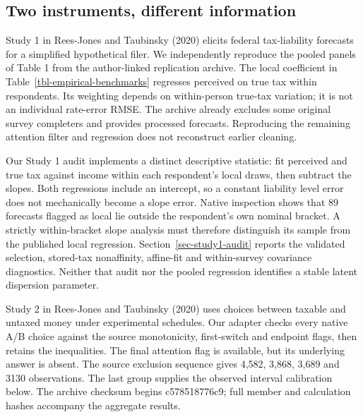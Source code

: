 \documentclass[
  11pt,
  letterpaper,
  DIV=11,
  numbers=noendperiod]{scrartcl}
\begin{document}
\subsection{Two instruments, different
information}\label{two-instruments-different-information}

Study 1 in Rees-Jones and Taubinsky (2020) elicits federal tax-liability
forecasts for a simplified hypothetical filer. We independently
reproduce the pooled panels of Table 1 from the author-linked
replication archive. The local coefficient in
Table~\ref{tbl-empirical-benchmarks} regresses perceived on true tax
within respondents. Its weighting depends on within-person true-tax
variation; it is not an individual rate-error RMSE. The archive already
excludes some original survey completers and provides processed
forecasts. Reproducing the remaining attention filter and regression
does not reconstruct earlier cleaning.

Our Study 1 audit implements a distinct descriptive statistic: fit
perceived and true tax against income within each respondent's local
draws, then subtract the slopes. Both regressions include an intercept,
so a constant liability level error does not mechanically become a slope
error. Native inspection shows that 89 forecasts flagged as local lie
outside the respondent's own nominal bracket. A strictly within-bracket
slope analysis must therefore distinguish its sample from the published
local regression. Section~\ref{sec-study1-audit} reports the validated
selection, stored-tax nonaffinity, affine-fit and within-survey
covariance diagnostics. Neither that audit nor the pooled regression
identifies a stable latent dispersion parameter.

Study 2 in Rees-Jones and Taubinsky (2020) uses choices between taxable
and untaxed money under experimental schedules. Our adapter checks every
native A/B choice against the source monotonicity, first-switch and
endpoint flags, then retains the inequalities. The final attention flag
is available, but its underlying answer is absent. The source exclusion
sequence gives 4,582, 3,868, 3,689 and 3130 observations. The last group
supplies the observed interval calibration below. The archive checksum
begins c578518776c9; full member and calculation hashes accompany the
aggregate results.
\end{document}
